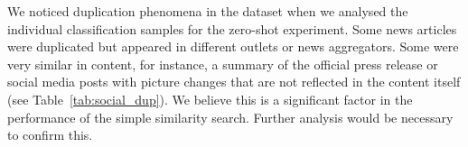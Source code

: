 We noticed duplication phenomena in the dataset when we analysed the individual classification samples for the zero-shot experiment.
Some news articles were duplicated but appeared in different outlets or news aggregators. 
Some were very similar in content, for instance, a summary of the official press release or social media posts with picture changes that are not reflected in the content itself (see Table~\ref{tab:social_dup}).
We believe this is a significant factor in the performance of the simple similarity search. 
Further analysis would be necessary to confirm this.


\begin{table}[h]
    \centering
    \caption{An example social media post from $NewsMon_{sl+cls}$ corpora which is repeated for every update.}
\label{tab:social_dup}
\end{table}
